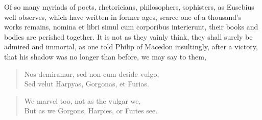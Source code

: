 {Of so many myriads of poets, rhetoricians, philosophers, sophisters, as
Eusebius well observes, which have written in former ages, scarce
one of a thousand's works remains, nomina et libri simul cum corporibus
interierunt, their books and bodies are perished together. It is not as
they vainly think, they shall surely be admired and immortal, as one
told Philip of Macedon insultingly, after a victory, that his shadow
was no longer than before, we may say to them,

\begin{verse}
\textlatin{Nos demiramur, sed non cum deside vulgo,}\\
\textlatin{Sed velut Harpyas, Gorgonas, et Furias.}
\end{verse}

\begin{verse}
We marvel too, not as the vulgar we,\\
But as we Gorgons, Harpies, or Furies see.
\end{verse}

}
